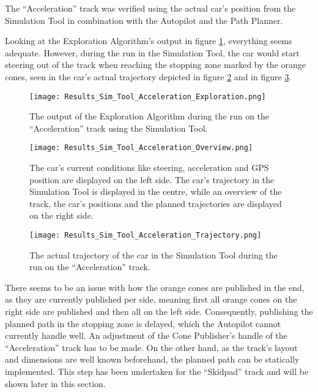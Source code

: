 The ``Acceleration'' track was verified using the actual car's position from the Simulation Tool in combination with the Autopilot and the Path Planner.

Looking at the Exploration Algorithm's output in figure \ref{fig:Results Sim Tool Acceleration Exploration}, everything seems adequate. 
However, during the run in the Simulation Tool, the car would start steering out of the track when reaching the stopping zone marked by the orange cones, seen in the car's actual trajectory depicted in figure \ref{fig:Results Sim Tool Acceleration Overview} and in figure \ref{fig:Results Sim Tool Acceleration Trajectory}.
\begin{figure}[H]
    \centering
    \texttt{[image: Results\_Sim\_Tool\_Acceleration\_Exploration.png]}
    \caption{The output of the Exploration Algorithm during the run on the ``Acceleration'' track using the Simulation Tool.}
    \label{fig:Results Sim Tool Acceleration Exploration}
\end{figure}
\begin{figure}[H]
    \centering
    \texttt{[image: Results\_Sim\_Tool\_Acceleration\_Overview.png]}
    \caption{The car's current conditions like steering, acceleration and GPS position are displayed on the left side. The car's trajectory in the Simulation Tool is displayed in the centre, while an overview of the track, the car's positions and the planned trajectories are displayed on the right side.}
    \label{fig:Results Sim Tool Acceleration Overview}
\end{figure}
\begin{figure}[H]
    \centering
    \texttt{[image: Results\_Sim\_Tool\_Acceleration\_Trajectory.png]}
    \caption{The actual trajectory of the car in the Simulation Tool during the run on the ``Acceleration'' track.}
    \label{fig:Results Sim Tool Acceleration Trajectory}
\end{figure}

There seems to be an issue with how the orange cones are published in the end, as they are currently published per side, meaning first all orange cones on the right side are published and then all on the left side. Consequently, publishing the planned path in the stopping zone is delayed, which the Autopilot cannot currently handle well. An adjustment of the Cone Publisher's handle of the ``Acceleration'' track has to be made. On the other hand, as the track's layout and dimensions are well known beforehand, the planned path can be statically implemented. This step has been undertaken for the ``Skidpad'' track and will be shown later in this section.

